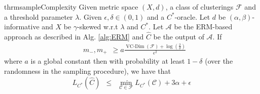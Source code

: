 \documentclass[12pt]{article}
\newcommand{\mc}{\mathcal}
\DeclareMathOperator*{\vcdim}{VC-Dim}
\begin{document}
\begin{restatable}{thrm}{sampleComplexity}
\label{thm:sampleComplexity}
Given metric space $(X, d)$, a class of clusterings $\mc F$ and a threshold parameter $\lambda$. Given $\epsilon, \delta \in (0, 1)$ and a $C^*$-oracle. Let $d$ be $(\alpha, \beta)$-informative and $X$ be $\gamma$-skewed w.r.t $\lambda$ and $C^*$. Let $\mc A$ be the ERM-based approach as described in Alg. \ref{alg:ERM} and $\hat C$ be the output of $\mc A$. If  
\begin{align}
  &m_-, m_+ \enspace \ge a\frac{\vcdim({\mc F}) + \log(\frac{2}{\delta})}{\epsilon^2} 
\end{align}
where $a$ is a global constant then with probability at least $1-\delta$ (over the randomness in the sampling procedure), we have that $$L_{C^*}(\hat C) \enspace\le\enspace \min_{\mc C \in \mc F} L_{C^*}(\mc C) + 3\alpha + \epsilon$$
\end{restatable}
\end{document}
